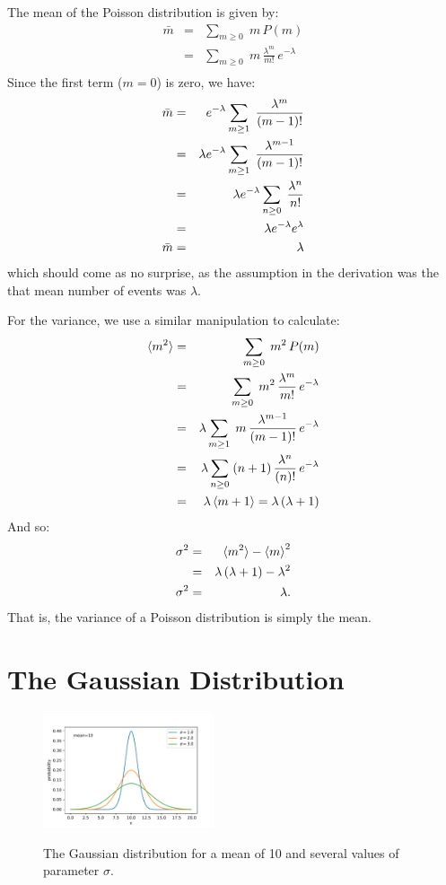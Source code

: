 \documentclass[12pt,oneside]{book}
\begin{document}
The mean of the Poisson distribution is given by:
\begin{eqnarray*}
\bar{m} &=& \sum_{m \geq 0} \; m \, P(m) \\
&=& \sum_{m \geq 0} \; m \, \frac{\lambda^m}{m!} \, e^{-\lambda}\\
\end{eqnarray*}
Since the first term ($m=0$) is zero, we have:
\begin{eqnarray}
\bar{m} &=& e^{-\lambda} \sum_{m \geq 1} \; \frac{\lambda^m}{(m-1)!} \notag \\
             &=& \lambda e^{-\lambda} \sum_{m \geq 1} \; \frac{\lambda^{m-1}}{(m-1)!} \notag \\
             &=& \lambda e^{-\lambda} \sum_{n \geq 0} \; \frac{\lambda^{n}}{n!} \notag \\
             &=& \lambda e^{-\lambda} e^\lambda \notag \\
\bar{m}  &=& \lambda
\end{eqnarray}
which should come as no surprise, as the assumption in the derivation was the that mean number of events was $\lambda$. 

For the variance, we use a similar manipulation to calculate:
\begin{eqnarray*}
\braket{m^2} &=& \sum_{m \geq 0} \; m^2 \, P(m) \\
&=& \sum_{m \geq 0} \; m^2 \, \frac{\lambda^m}{m!} \, e^{-\lambda}\\
&=& \lambda \sum_{m \geq 1} \; m \, \frac{\lambda^{m-1}}{(m-1)!} \, e^{-\lambda}\\
&=& \lambda \sum_{n \geq 0} \; (n+1) \, \frac{\lambda^{n}}{(n)!} \, e^{-\lambda}\\
&=& \lambda \braket{m+1} = \lambda \, (\lambda+1)
\end{eqnarray*}
And so:
\begin{eqnarray}
\sigma^2 &=& \braket{m^2} - \braket{m}^2 \notag \\
&=& \lambda \, (\lambda+1) - \lambda^2 \notag \\
\sigma^2 &=& \lambda. 
\end{eqnarray}
That is, the variance of a Poisson distribution is simply the mean.

\section{The Gaussian Distribution}

\begin{figure}[htbp]
\begin{center}
{\includegraphics[width=0.45\textwidth]{figs/gaussian.pdf}}
\end{center}
\caption{\label{fig:gaussian}  The Gaussian distribution for a mean of 10 and several values of parameter $\sigma$.}
\end{figure}
\end{document}
